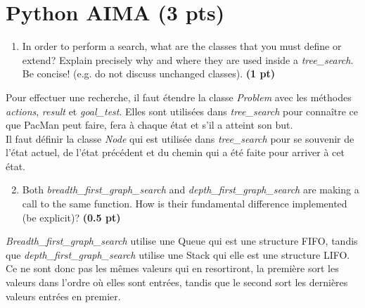\documentclass[11pt,a4paper]{../template/report}
\begin{document}
\maketitle

\section{Python AIMA (3 pts)}

\begin{enumerate}
  \item In order to perform a search, what are the classes that you must define or extend? Explain precisely why and where they are used inside a \textit{tree\_search}. Be concise! (e.g. do not discuss unchanged classes). \textbf{(1 pt)}
\end{enumerate}

\begin{answer}
Pour effectuer une recherche, il faut étendre la classe \textit{Problem} avec les méthodes \textit{actions}, \textit{result} et \textit{goal\_test}. Elles sont utilisées dans \textit{tree\_search} pour connaître ce que PacMan peut faire, fera à chaque état et s'il a atteint son but. \\
Il faut définir la classe \textit{Node} qui est utilisée dans \textit{tree\_search} pour se souvenir de l'état actuel, de l'état précédent et du chemin qui a été faite pour arriver à cet état.
\end{answer}



\begin{enumerate}
\setcounter{enumi}{1}
    \item Both \textit{breadth\_first\_graph\_search} and \textit{depth\_first\_graph\_search} are making a call to the same function. How is their fundamental difference implemented (be explicit)? \textbf{(0.5 pt)}
\end{enumerate}

\begin{answer}
\textit{Breadth\_first\_graph\_search} utilise une Queue qui est une structure FIFO, tandis que \textit{depth\_first\_graph\_search} utilise une Stack qui elle est une structure LIFO. Ce ne sont donc pas les mêmes valeurs qui en resortiront, la première sort les valeurs dans l'ordre où elles sont entrées, tandis que le second sort les dernières valeurs entrées en premier.
\end{answer}
\end{document}
